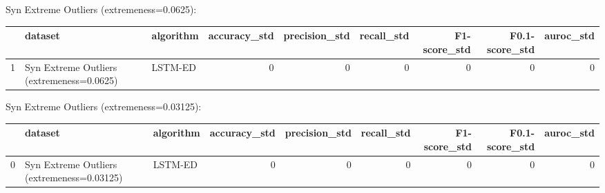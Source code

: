 Syn Extreme Outliers (extremeness=0.0625):

\begin{tabular}{rllrrrrrr}
\hline
    & dataset                                   & algorithm   &   accuracy\_std &   precision\_std &   recall\_std &   F1-score\_std &   F0.1-score\_std &   auroc\_std \\
\hline
  1 & Syn Extreme Outliers (extremeness=0.0625) & LSTM-ED     &              0 &               0 &            0 &              0 &                0 &           0 \\
\hline
\end{tabular}

Syn Extreme Outliers (extremeness=0.03125):

\begin{tabular}{rllrrrrrr}
\hline
    & dataset                                    & algorithm   &   accuracy\_std &   precision\_std &   recall\_std &   F1-score\_std &   F0.1-score\_std &   auroc\_std \\
\hline
  0 & Syn Extreme Outliers (extremeness=0.03125) & LSTM-ED     &              0 &               0 &            0 &              0 &                0 &           0 \\
\hline
\end{tabular}

